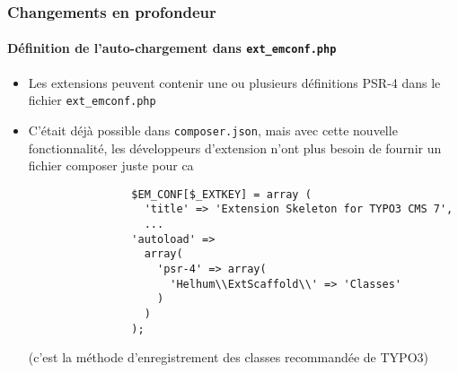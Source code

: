 \begin{frame}[fragile]
	\frametitle{Changements en profondeur}
	\framesubtitle{Définition de l'auto-chargement dans \texttt{ext\_emconf.php}}

	\lstset{basicstyle=\tiny\ttfamily}

	\begin{itemize}

		\item Les extensions peuvent contenir une ou plusieurs définitions PSR-4 dans le fichier \texttt{ext\_emconf.php}

		\item C'était déjà possible dans \texttt{composer.json}, mais avec cette nouvelle fonctionnalité,
			les développeurs d'extension n'ont plus besoin de fournir un fichier composer juste pour ca

			\begin{lstlisting}
				$EM_CONF[$_EXTKEY] = array (
				  'title' => 'Extension Skeleton for TYPO3 CMS 7',
				  ...
				'autoload' =>
				  array(
				    'psr-4' => array(
				      'Helhum\\ExtScaffold\\' => 'Classes'
				    )
				  )
				);
			\end{lstlisting}

			\small
				(c'est la méthode d'enregistrement des classes recommandée de TYPO3)
			\normalsize

	\end{itemize}

\end{frame}


